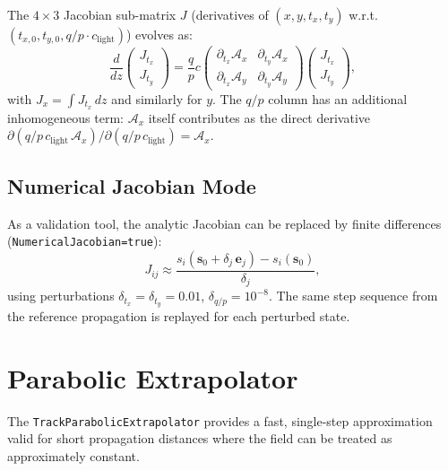 \documentclass[11pt,a4paper]{article}
\newcommand{\qop}{q/p}
\newcommand{\bvec}[1]{\mathbf{#1}}
\newcommand{\vstate}{\bvec{s}}
\newcommand{\clgt}{c_\text{light}}
\begin{document}
The $4\times3$ Jacobian sub-matrix $J$ (derivatives of $(x,y,t_x,t_y)$
w.r.t.\ $(t_{x,0},t_{y,0},\qop\cdot\clgt)$) evolves as:
\begin{equation}\label{eq:variational}
  \frac{d}{dz}\!\begin{pmatrix} J_{t_x} \\ J_{t_y} \end{pmatrix}
  = \frac{q}{p}c
  \begin{pmatrix}
    \partial_{t_x}\mathcal{A}_x & \partial_{t_y}\mathcal{A}_x \\
    \partial_{t_x}\mathcal{A}_y & \partial_{t_y}\mathcal{A}_y
  \end{pmatrix}
  \!\begin{pmatrix} J_{t_x} \\ J_{t_y} \end{pmatrix},
\end{equation}
with $J_x = \int J_{t_x}\,dz$ and similarly for $y$. The $\qop$ column has
an additional inhomogeneous term: $\mathcal{A}_x$ itself contributes as the
direct derivative $\partial(\qop\,\clgt\,\mathcal{A}_x)/\partial(\qop\,\clgt) = \mathcal{A}_x$.

\subsection{Numerical Jacobian Mode}

As a validation tool, the analytic Jacobian can be replaced by finite
differences (\texttt{NumericalJacobian=\allowbreak true}):
\begin{equation}
  J_{ij} \approx \frac{s_i(\vstate_0 + \delta_j\,\bvec{e}_j) - s_i(\vstate_0)}{\delta_j},
\end{equation}
using perturbations $\delta_{t_x} = \delta_{t_y} = 0.01$,
$\delta_{\qop} = 10^{-8}$. The same step sequence from the reference
propagation is replayed for each perturbed state.


\section{Parabolic Extrapolator}\label{sec:parabolic}

The \texttt{TrackParabolicExtrapolator} provides a fast, single-step
approximation valid for short propagation distances where the field can be
treated as approximately constant.
\end{document}
